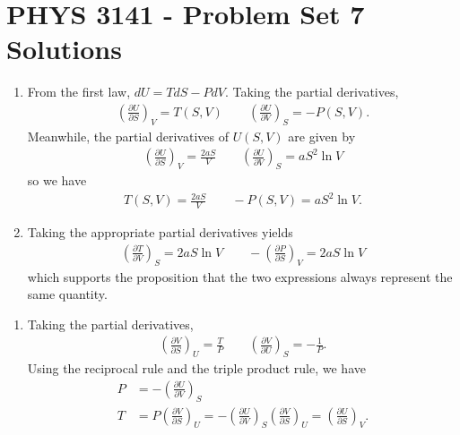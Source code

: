 \documentclass[a4paper,12pt]{article}
\begin{document}
\section*{PHYS 3141 - Problem Set 7 Solutions}

\begin{enumerate}[label=\textbf{[\arabic*]}]
    \item
        \begin{enumerate}
            \item
                From the first law, $dU = TdS - PdV$. Taking the partial derivatives,
                \begin{align*}
                    \left( \frac{\partial U}{\partial S} \right)_V = T(S, V) \qquad \left( \frac{\partial U}{\partial V} \right)_S = -P(S, V).
                \end{align*}
                Meanwhile, the partial derivatives of $U(S, V)$ are given by
                \begin{align*}
                    \left( \frac{\partial U}{\partial S} \right)_V = \frac{2aS}{V} \qquad \left( \frac{\partial U}{\partial V} \right)_S = a S^2 \ln V
                \end{align*}
                so we have
                \begin{align*}
                    T(S, V) = \frac{2aS}{V} \qquad -P(S, V) = aS^2 \ln V.
                \end{align*}
        
            \item
                Taking the appropriate partial derivatives yields
                \begin{align*}
                    \left( \frac{\partial T}{\partial V} \right)_S = 2aS \ln V \qquad -\left( \frac{\partial P}{\partial S} \right)_V = 2aS \ln V
                \end{align*}
                which supports the proposition that the two expressions always represent the same quantity.
        \end{enumerate}

        \item
            \begin{enumerate}
                \item
                    Taking the partial derivatives,
                    \begin{align*}
                        \left( \frac{\partial V}{\partial S} \right)_U = \frac{T}{P} \qquad \left( \frac{\partial V}{\partial U} \right)_S = -\frac{1}{P}.
                    \end{align*}
                    Using the reciprocal rule and the triple product rule, we have
                    \begin{align}
                        P &= -\left( \frac{\partial U}{\partial V} \right)_S \\
                        T &= P \left( \frac{\partial V}{\partial S} \right)_U = -\left( \frac{\partial U}{\partial V} \right)_S \left( \frac{\partial V}{\partial S} \right)_U = \left( \frac{\partial U}{\partial S} \right)_V.
                    \end{align}
                    

\end{enumerate}
\end{enumerate}
\end{document}
